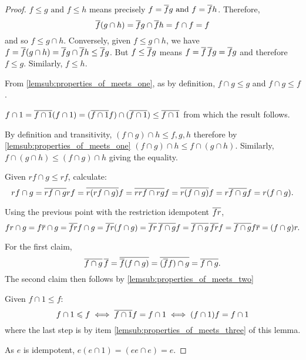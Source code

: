 \begin{proof}
\bproofenum
\item $f\le g \text{ and } f \le h$ means precisely
$f = \overline{f} g \text{ and } f = \overline{f} h$.
Therefore,
\[\overline{f} (g\cap h) =  \overline{f} g \cap \overline{f} h =  f\cap f = f\]
and so $f \le g \cap h$.
Conversely, given $f \le g\cap h$, we have $f = \overline{f} (g\cap h) =
\overline{f} g \cap \overline{f} h \le \overline{f} g $. But $f \le \overline{f}
g$ means $f = \overline{f}\,\overline{f} g = \overline{f}g$ and therefore $f \le
g$. Similarly, $f \le h$.
\item From \ref{lemsub:properties_of_meets_one}, as by definition, $f\cap g \le g$ and $f \cap g \le f$.

\item $f\cap 1 = \overline{f\cap 1} (f \cap 1)=
(\overline{f \cap 1} f ) \cap (\overline{f \cap 1}) \le \overline{f \cap 1}$ from
which the result follows. %

\item By definition and transitivity, $(f\cap g)\cap h \le f, g, h$
therefore by \ref{lemsub:properties_of_meets_one} $(f \cap g) \cap h \le
 f \cap (g \cap h)$. Similarly, $f \cap (g \cap h) \le(f \cap g) \cap h$
giving the equality.
\item Given  $r f \cap g \le r f$, calculate:
\[
r f\cap g
= \overline{r f\cap g} r f
= \overline{r (r f\cap g)} f
= \overline{r r f\cap r g} f
= \overline{r (f\cap g)} f
= r \overline{f\cap g} f
= r (f\cap g).\]
\item Using the previous point with the restriction
idempotent $\overline{f r}$,
\[
f r \cap g
= f \restr{r} \cap g   %
= \restr{f r }f \cap g  %
=\restr{f r}(f\cap g)   %
= \restr{f r}\, \restr{f\cap g} f %
=  \restr{f\cap g}\, \restr{f r} f %
=  \restr{f\cap g} f \restr{r}  %
= (f\cap g) r.\] %
\item For the first claim,
\[\overline{f\cap g}\, \overline{f}
=\overline{\overline{f}(f\cap g)}
=\overline{(\overline{f}f)\cap g}
=\overline{f\cap g}.\]
The second claim then follows by \ref{lemsub:properties_of_meets_two}
\item Given $ f \cap 1 \leq f$:
\[ f \cap 1 \leqslant f \iff  \overline{f \cap 1} f = f \cap 1
\iff  (f \cap 1) f = f \cap 1\]
where the last step is by item \ref{lemsub:properties_of_meets_three} of this lemma.
\item As $e$ is idempotent, $e (e\cap 1) = (e e \cap e) = e$.

\eproofenum
\end{proof}

